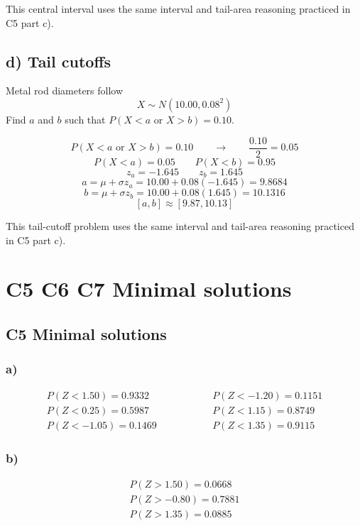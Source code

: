 This central interval uses the same interval and tail-area reasoning practiced in C5 part c).


\subsection*{d) Tail cutoffs}
\label{subsec:inverse-normal-problems-c7-d}
Metal rod diameters follow
\[
X\sim N(10.00,0.08^2)
\]
Find \(a\) and \(b\) such that \(P(X<a\text{ or }X>b)=0.10\).

\[
P(X<a\text{ or }X>b)=0.10
\qquad \longrightarrow \qquad
\frac{0.10}{2}=0.05
\]
\[
P(X<a)=0.05
\qquad
P(X<b)=0.95
\]
\[
z_a=-1.645
\qquad
z_b=1.645
\]
\[
a=\mu+\sigma z_a
=10.00+0.08(-1.645)
=9.8684
\]
\[
b=\mu+\sigma z_b
=10.00+0.08(1.645)
=10.1316
\]
\[
[a,b]\approx[9.87,10.13]
\]

This tail-cutoff problem uses the same interval and tail-area reasoning practiced in C5 part c).



\section{C5 C6 C7 Minimal solutions}

\subsection{C5 Minimal solutions}

\subsubsection*{a)}
\[
\begin{array}{lll}
	P(Z<1.50)=0.9332
	& \qquad \qquad &
	P(Z<-1.20)=0.1151
	\\[0.2cm]
	P(Z<0.25)=0.5987
	& &
	P(Z<1.15)=0.8749
	\\[0.2cm]
	P(Z<-1.05)=0.1469
	& &
	P(Z<1.35)=0.9115
\end{array}
\]

\subsubsection*{b)}
\[
\begin{array}{l}
	P(Z>1.50)=0.0668
	\\
	P(Z>-0.80)=0.7881
	\\
	P(Z>1.35)=0.0885
\end{array}
\]

